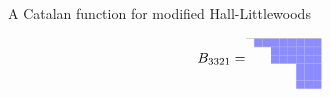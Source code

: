 \documentclass[dvipsnames]{beamer}
\theoremstyle{definition}
\newcommand{\qtrootcolor}{blue!45}
\begin{document}
\begin{frame}{A Catalan function for modified Hall-Littlewoods}

  {\small {}}
\vspace{.4mm}
\vspace{-4.4mm}
\begin{align*}
\raisebox{6.7mm}{${B_{3321} = }$}
\begin{tikzpicture}[scale=.213]
\draw[draw = none, fill = \qtrootcolor] (2,-1) rectangle (3,-2);
 \draw[draw = none, fill = \qtrootcolor] (3,-1) rectangle (4,-2);
 \draw[draw = none, fill = \qtrootcolor] (4,-1) rectangle (5,-2);
 \draw[draw = none, fill = \qtrootcolor] (4,-2) rectangle (5,-3);
 \draw[draw = none, fill = \qtrootcolor] (4,-3) rectangle (5,-4);
 \draw[draw = none, fill = \qtrootcolor] (5,-1) rectangle (6,-2);
 \draw[draw = none, fill = \qtrootcolor] (5,-2) rectangle (6,-3);
 \draw[draw = none, fill = \qtrootcolor] (5,-3) rectangle (6,-4);
 \draw[draw = none, fill = \qtrootcolor] (6,-1) rectangle (7,-2);
 \draw[draw = none, fill = \qtrootcolor] (6,-2) rectangle (7,-3);
 \draw[draw = none, fill = \qtrootcolor] (6,-3) rectangle (7,-4);
 \draw[draw = none, fill = \qtrootcolor] (7,-1) rectangle (8,-2);
 \draw[draw = none, fill = \qtrootcolor] (7,-2) rectangle (8,-3);
 \draw[draw = none, fill = \qtrootcolor] (7,-3) rectangle (8,-4);
 \draw[draw = none, fill = \qtrootcolor] (7,-4) rectangle (8,-5);
 \draw[draw = none, fill = \qtrootcolor] (7,-5) rectangle (8,-6);
 \draw[draw = none, fill = \qtrootcolor] (7,-6) rectangle (8,-7);
 \draw[draw = none, fill = \qtrootcolor] (8,-1) rectangle (9,-2);
 \draw[draw = none, fill = \qtrootcolor] (8,-2) rectangle (9,-3);
 \draw[draw = none, fill = \qtrootcolor] (8,-3) rectangle (9,-4);
 \draw[draw = none, fill = \qtrootcolor] (8,-4) rectangle (9,-5);
 \draw[draw = none, fill = \qtrootcolor] (8,-5) rectangle (9,-6);
 \draw[draw = none, fill = \qtrootcolor] (8,-6) rectangle (9,-7);
 \draw[draw = none, fill = \qtrootcolor] (9,-1) rectangle (10,-2);
 \draw[draw = none, fill = \qtrootcolor] (9,-2) rectangle (10,-3);
 \draw[draw = none, fill = \qtrootcolor] (9,-3) rectangle (10,-4);
 \draw[draw = none, fill = \qtrootcolor] (9,-4) rectangle (10,-5);
 \draw[draw = none, fill = \qtrootcolor] (9,-5) rectangle (10,-6);
 \draw[draw = none, fill = \qtrootcolor] (9,-6) rectangle (10,-7);
 \draw[thin, black!31] (1,-1) -- (10,-1);
\draw[thin, black!31] (2,-1) -- (2,-1);
\draw[thin, black!31] (2,-2) -- (10,-2);
\draw[thin, black!31] (3,-2) -- (3,-1);

\end{tikzpicture}
\end{align*}
\end{frame}
\end{document}

